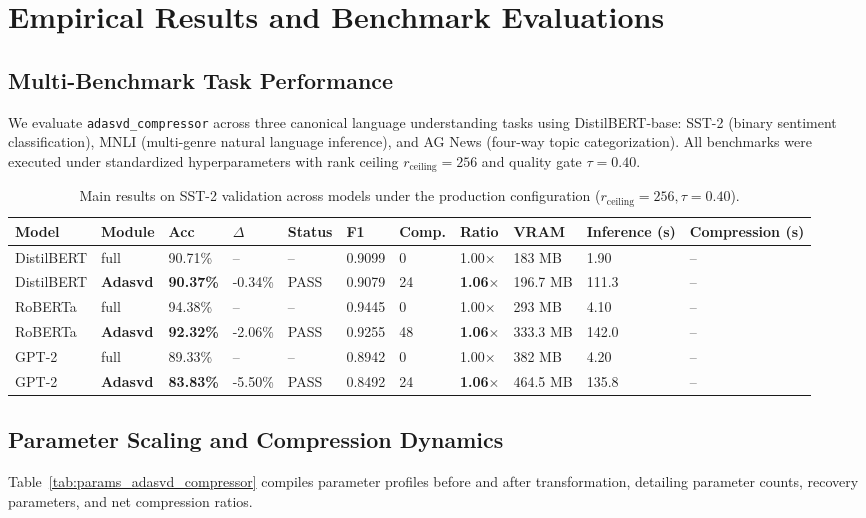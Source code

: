 \section{Empirical Results and Benchmark Evaluations}
\label{sec:results}

\subsection{Multi-Benchmark Task Performance}
We evaluate \texttt{adasvd\_compressor} across three canonical language understanding tasks using DistilBERT-base: SST-2 (binary sentiment classification), MNLI (multi-genre natural language inference), and AG News (four-way topic categorization). All benchmarks were executed under standardized hyperparameters with rank ceiling $r_{\mathrm{ceiling}} = 256$ and quality gate $\tau = 0.40$.

\begin{table}[t]
\centering
\small
\begin{tabular}{lllllllllll}
\toprule
\textbf{Model} & \textbf{Module} & \textbf{Acc} & \textbf{$\Delta$} & \textbf{Status} & \textbf{F1} & \textbf{Comp.} & \textbf{Ratio} & \textbf{VRAM} & \textbf{Inference (s)} & \textbf{Compression (s)} \\
\midrule
DistilBERT & full & 90.71\% & -- & -- & 0.9099 & 0 & 1.00$\times$ & 183 MB & 1.90 & -- \\
DistilBERT & \textbf{Adasvd} & \textbf{90.37\%} & -0.34\% & PASS & 0.9079 & 24 & \textbf{1.06$\times$} & 196.7 MB & 111.3 & -- \\
RoBERTa & full & 94.38\% & -- & -- & 0.9445 & 0 & 1.00$\times$ & 293 MB & 4.10 & -- \\
RoBERTa & \textbf{Adasvd} & \textbf{92.32\%} & -2.06\% & PASS & 0.9255 & 48 & \textbf{1.06$\times$} & 333.3 MB & 142.0 & -- \\
GPT-2 & full & 89.33\% & -- & -- & 0.8942 & 0 & 1.00$\times$ & 382 MB & 4.20 & -- \\
GPT-2 & \textbf{Adasvd} & \textbf{83.83\%} & -5.50\% & PASS & 0.8492 & 24 & \textbf{1.06$\times$} & 464.5 MB & 135.8 & -- \\
\bottomrule
\end{tabular}
\caption{Main results on SST-2 validation across models under the production configuration ($r_{\mathrm{ceiling}}=256, \tau=0.40$).}
\label{tab:main_sst2}
\end{table}

\subsection{Parameter Scaling and Compression Dynamics}
Table~\ref{tab:params_adasvd_compressor} compiles parameter profiles before and after transformation, detailing parameter counts, recovery parameters, and net compression ratios.


